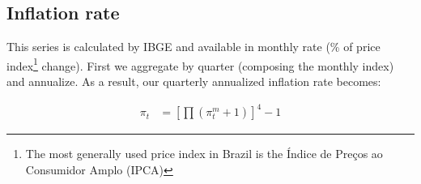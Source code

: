 \subsection{Inflation rate}
This series is calculated by IBGE and available in monthly rate (\% of price index\footnote{The most generally used price index in Brazil is the Índice de Preços ao Consumidor Amplo (IPCA)} change). First we aggregate by quarter (composing the monthly index) and annualize. As a result, our quarterly annualized inflation rate becomes:

\begin{align}
\pi_t &= \left[\prod(\pi_t^m+1)\right]^{4}-1
\end{align}



